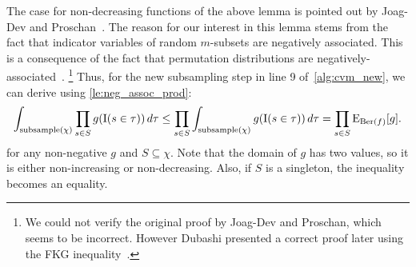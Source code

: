 The case for non-decreasing functions of the above lemma is pointed out by Joag-Dev and Proschan~\cite[P.2]{joagdev1983}.
The reason for our interest in this lemma stems from the fact that indicator variables of random $m$-subsets are negatively associated.
This is a consequence of the fact that permutation distributions are negatively-associated~\cite[Th. 2.11]{joagdev1983}.%
\footnote{We could not verify the original proof by Joag-Dev and Proschan, which seems to be incorrect.
However Dubashi presented a correct proof later using the FKG inequality~\cite[Th. 10]{dubhashi1996}.}
Thus, for the new subsampling step in line 9 of~\cref{alg:cvm_new}, we can derive using \cref{le:neg_assoc_prod}:
\begin{equation}\label{eq:subsample_with_n_subsets}
  \int_{\mathrm{subsample}(\chi)} \prod_{s \in S} g(\operatorname{\mathrm{I}}(s \in \tau))\,d\tau \leq
  \prod_{s \in S} \int_{\mathrm{subsample}(\chi)} g(\operatorname{\mathrm{I}}(s \in \tau))\,d\tau = \prod_{s \in S}  \operatorname{\mathrm{E}}_{\operatorname{\mathrm{Ber}}(f)}[g] \textrm{.}
\end{equation}
for any non-negative $g$ and $S \subseteq \chi$.
Note that the domain of $g$ has two values, so it is either non-increasing or non-decreasing.
Also, if $S$ is a singleton, the inequality becomes an equality.


